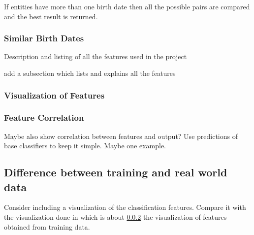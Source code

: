 \documentclass[epsfig,a4paper,11pt,titlepage,twoside,openany]{book}
\begin{document}
 
 
 If entities have more than one birth date then all the possible pairs are compared and the best result is returned.  
 
 
\subsubsection{Similar Birth Dates}
\label{sec:feature-similar-death-dates}
 





Description and listing of all the features used in the project

add a subsection which lists and explains all the features


\subsubsection{Visualization of Features}
\label{sec:feature-viz}

\subsubsection{Feature Correlation}
\label{sec:feature-correlation}

Maybe also show correlation between features and output? Use predictions of base
classifiers to keep it simple. Maybe one example.

\subsection{Difference between training and real world data}
\label{sec:training-real-data-difference}

Consider including a visualization of the classification features. Compare it
with the visualization done in \pageref{sec:feature-viz} which is about
\ref{sec:feature-viz} the visualization of features obtained from training data.



\end{document}
